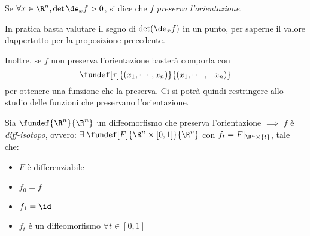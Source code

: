 \begin{defn}
Se $\forall x \in \R^n, \det \de_xf > 0$, si dice che $f$ \emph{preserva l'orientazione}.
\end{defn}

\begin{oss}
In pratica basta valutare il segno di $\det (\de_xf)$ in un punto, per saperne il valore dappertutto per la proposizione precedente.

Inoltre, se $f$ non preserva l'orientazione basterà comporla con
\begin{equation*}
\fundef[\tau]{(x_1,\cdots,x_n)}{(x_1,\cdots,-x_n)}
\end{equation*}
per ottenere una funzione che la preserva. Ci si potrà quindi restringere allo studio delle funzioni che preservano l'orientazione.
\end{oss}

\begin{teo}
Sia $\fundef{\R^n}{\R^n}$ un diffeomorfismo che preserva l'orientazione $\implies$ $f$ è \emph{diff-isotopo}, ovvero:
$\exists \; \fundef[F]{\R^n \times [0,1]}{\R^n}$ con $f_t = F|_{\R^n \times \{t\}}$, tale che:
\begin{itemize}
\item $F$ è differenziabile
\item $f_0=f$
\item $f_1 = \id$
\item $f_t$ è un diffeomorfismo $\forall t \in [0,1]$
\end{itemize}
\end{teo}

